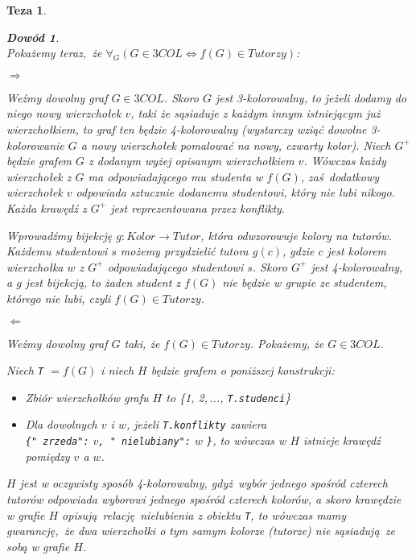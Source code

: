 \documentclass[12pt]{article}
\newtheorem*{theorem*}{Teza}
\newtheorem*{proof*}{Dowód}
\begin{document}
\begin{titlepage}
\begin{theorem*}
\begin{proof*}
$ $\\
Pokażemy teraz, że $\forall_G(G \in 3COL \Leftrightarrow f(G) \in Tutorzy)$:

$ $\\
$\Rightarrow$ 

Weźmy dowolny graf $G \in 3COL$. Skoro $G$ jest 3-kolorowalny, to jeżeli dodamy 
do niego nowy wierzchołek $v$, taki że sąsiaduje z każdym innym 
istniejącym już wierzchołkiem, to graf ten będzie 4-kolorowalny (wystarczy 
wziąć dowolne 3-kolorowanie $G$ a nowy wierzchołek pomalować na nowy, czwarty 
kolor). Niech $G^+$ będzie grafem $G$ z dodanym wyżej opisanym wierzchołkiem $v$.
Wówczas każdy wierzchołek z $G$ ma odpowiadającego mu studenta w $f(G)$, 
zaś dodatkowy wierzchołek $v$ odpowiada sztucznie dodanemu studentowi, który 
nie lubi nikogo. Każda krawędź z $G^+$ jest reprezentowana przez 
\textit{konflikty}. 

Wprowadźmy bijekcję $g : Kolor \rightarrow Tutor$, która odwzorowuje kolory na tutorów.
Każdemu studentowi $s$ możemy przydzielić tutora $g(c)$, gdzie $c$ jest 
kolorem wierzchołka $w$ z $G^+$ odpowiadającego studentowi $s$. Skoro $G^+$ 
jest 4-kolorowalny, a $g$ jest bijekcją, to żaden student z $f(G)$ nie będzie w grupie ze studentem, którego nie lubi, czyli $f(G) \in Tutorzy$.

$ $\\
$\Leftarrow$

Weźmy dowolny graf $G$ taki, że $f(G) \in Tutorzy$. Pokażemy, że $G \in 3COL$.


Niech \texttt{T} $= f(G)$ i niech $H$ będzie grafem o poniższej konstrukcji:
\begin{itemize}
    \item Zbiór wierzchołków grafu $H$ to \{1, 2,\,..., \texttt{T.studenci}\}
    \item Dla dowolnych $v$ i $w$, jeżeli \texttt{T.konflikty} zawiera \\
        \texttt{\{"\hskip0pt zrzeda":} $v$\texttt{, "\hskip0pt nielubiany":} 
        $w$ \texttt{\}}, to wówczas w $H$ istnieje krawędź pomiędzy $v$ a $w$.
\end{itemize}

$H$ jest w oczywisty sposób 4-kolorowalny, gdyż wybór jednego spośród czterech 
tutorów odpowiada wyborowi jednego spośród czterech kolorów, a skoro krawędzie 
w grafie $H$ opisują relację \textit{nielubienia} z obiektu \texttt{T}, to 
wówczas mamy gwarancję, że dwa wierzchołki o tym samym kolorze (tutorze) nie 
sąsiadują ze sobą w grafie $H$.


\end{proof*}
\end{theorem*}
\end{titlepage}
\end{document}
